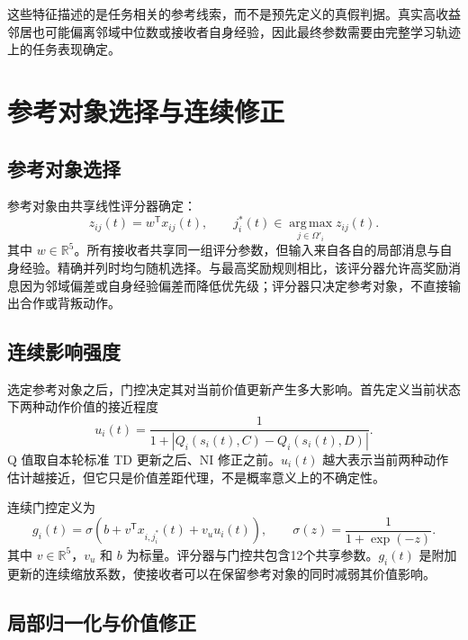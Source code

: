 这些特征描述的是任务相关的参考线索，而不是预先定义的真假判据。真实高收益邻居也可能偏离邻域中位数或接收者自身经验，因此最终参数需要由完整学习轨迹上的任务表现确定。

\section{参考对象选择与连续修正}
\subsection{参考对象选择}

参考对象由共享线性评分器确定：
\begin{equation}
 z_{ij}(t)=w^\mathsf T x_{ij}(t),\qquad
 j_i^*(t)\in\operatorname*{arg\,max}_{j\in\Omega'_i}z_{ij}(t).
 \label{eq:w2-score}
\end{equation}
其中 $w\in\mathbb R^5$。所有接收者共享同一组评分参数，但输入来自各自的局部消息与自身经验。精确并列时均匀随机选择。与最高奖励规则相比，该评分器允许高奖励消息因为邻域偏差或自身经验偏差而降低优先级；评分器只决定参考对象，不直接输出合作或背叛动作。

\subsection{连续影响强度}

选定参考对象之后，门控决定其对当前价值更新产生多大影响。首先定义当前状态下两种动作价值的接近程度
\begin{equation}
 u_i(t)=\frac{1}{1+|Q_i(s_i(t),C)-Q_i(s_i(t),D)|}.
 \label{eq:w2-q-proxy}
\end{equation}
Q 值取自本轮标准 TD 更新之后、NI 修正之前。$u_i(t)$ 越大表示当前两种动作估计越接近，但它只是价值差距代理，不是概率意义上的不确定性。

连续门控定义为
\begin{equation}
 g_i(t)=\sigma\left(b+v^\mathsf T x_{i,j_i^*}(t)+v_u u_i(t)\right),
 \qquad \sigma(z)=\frac{1}{1+\exp(-z)}.
 \label{eq:w2-gate}
\end{equation}
其中 $v\in\mathbb R^5$，$v_u$ 和 $b$ 为标量。评分器与门控共包含12个共享参数。$g_i(t)$ 是附加更新的连续缩放系数，使接收者可以在保留参考对象的同时减弱其价值影响。

\subsection{局部归一化与价值修正}

